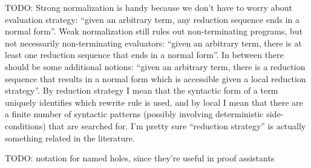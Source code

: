 \documentclass[11pt]{article} %
\theoremstyle{definition}
\theoremstyle{remark}
\begin{document}
TODO:
Strong normalization is handy because we don't have to worry about evaluation strategy: ``given an arbitrary term, any reduction sequence ends in a normal form''.
Weak normalization still rules out non-terminating programs, but not necessarily non-terminating evaluators: ``given an arbitrary term, there is at least one reduction sequence that ends in a normal form''.
In between there should be some additional notions: ``given an arbitrary term, there is a reduction sequence that results in a normal form which is accessible given a local reduction strategy''.
By reduction strategy I mean that the syntactic form of a term uniquely identifies which rewrite rule is used, and by local I mean that there are a finite number of syntactic patterns (possibly involving deterministic side-conditions) that are searched for.
I'm pretty sure ``reduction strategy'' is actually something related in the literature.

TODO: notation for named holes, since they're useful in proof assistants
\end{document}
